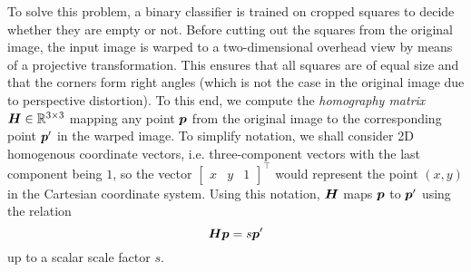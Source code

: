 \documentclass[../main.tex]{subfiles}
\begin{document}
To solve this problem, a binary classifier is trained on cropped squares to decide whether they are empty or not.
Before cutting out the squares from the original image, the input image is warped to a two-dimensional overhead view by means of a projective transformation.
This ensures that all squares are of equal size and that the corners form right angles (which is not the case in the original image due to perspective distortion).
To this end, we compute the \emph{homography matrix} ${\bm{H}} \in \mathbb{R}^{3 \times 3}$ \cite{szeliski2011} mapping any point
${\bm{p}}$
from the original image to
the corresponding point
${\bm{p}}'$
in the warped image.
To simplify notation, we shall consider 2D homogenous coordinate vectors, i.e. three-component vectors with the last component being $1$, so the vector
$\begin{bmatrix}
    x & y & 1
\end{bmatrix}^\top$
would represent the point $(x,y)$ in the Cartesian coordinate system.
Using this notation, ${\bm{H}}$ maps ${\bm{p}}$ to ${\bm{p}}'$ using the relation
\begin{equation}
    \label{eq:homography_matrix_relation}
    {\bm{H}}
    {\bm{p}}
    = s {\bm{p}}'
\end{equation}
up to a scalar scale factor $s$.
\end{document}
